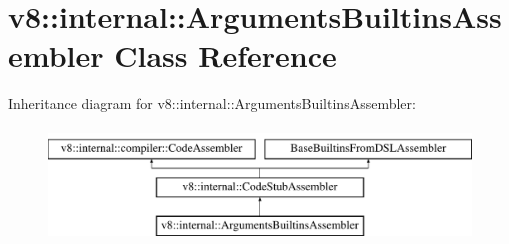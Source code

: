 \hypertarget{classv8_1_1internal_1_1ArgumentsBuiltinsAssembler}{}\section{v8\+:\+:internal\+:\+:Arguments\+Builtins\+Assembler Class Reference}
\label{classv8_1_1internal_1_1ArgumentsBuiltinsAssembler}
Inheritance diagram for v8\+:\+:internal\+:\+:Arguments\+Builtins\+Assembler\+:\begin{figure}[H]
\begin{center}
\leavevmode
\includegraphics[height=3.000000cm]{classv8_1_1internal_1_1ArgumentsBuiltinsAssembler}
\end{center}
\end{figure}
